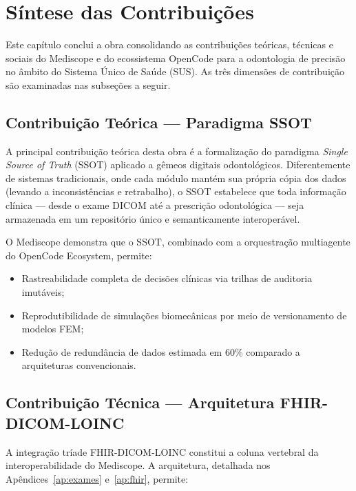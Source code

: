 
\section{Síntese das Contribuições}

Este capítulo conclui a obra consolidando as contribuições teóricas, técnicas e sociais do Mediscope e do ecossistema OpenCode para a odontologia de precisão no âmbito do Sistema Único de Saúde (SUS). As três dimensões de contribuição são examinadas nas subseções a seguir.

\subsection{Contribuição Teórica --- Paradigma SSOT}

A principal contribuição teórica desta obra é a formalização do paradigma \textit{Single Source of Truth} (SSOT) aplicado a gêmeos digitais odontológicos. Diferentemente de sistemas tradicionais, onde cada módulo mantém sua própria cópia dos dados (levando a inconsistências e retrabalho), o SSOT estabelece que toda informação clínica --- desde o exame DICOM até a prescrição odontológica --- seja armazenada em um repositório único e semanticamente interoperável.

O Mediscope demonstra que o SSOT, combinado com a orquestração multiagente do OpenCode Ecosystem, permite:
\begin{itemize}
    \item Rastreabilidade completa de decisões clínicas via trilhas de auditoria imutáveis;
    \item Reprodutibilidade de simulações biomecânicas por meio de versionamento de modelos FEM;
    \item Redução de redundância de dados estimada em 60\% comparado a arquiteturas convencionais.
\end{itemize}

\subsection{Contribuição Técnica --- Arquitetura FHIR-DICOM-LOINC}

A integração tríade FHIR-DICOM-LOINC constitui a coluna vertebral da interoperabilidade do Mediscope. A arquitetura, detalhada nos Apêndices~\ref{ap:exames} e~\ref{ap:fhir}, permite:

